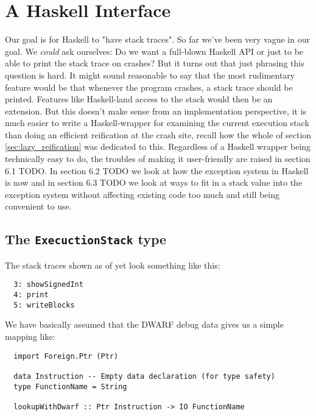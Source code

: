\chapter{A Haskell Interface}

Our goal is for Haskell to "have stack traces". So far we've been
very vague in our goal. We \emph{could} ask ourselves: Do we want a
full-blown Haskell API or just to be able to print the stack trace on
crashes? %
But it turns out that just phrasing this question is hard.
It might sound reasonable to say that the most rudimentary feature
would be that whenever the program crashes, a stack trace should be
printed. Features like Haskell-land access to the stack would then
be an extension. But this doesn't make sense from an implementation
perspective, it is much easier to write a Haskell-wrapper for examining
the current execution stack than doing an efficient reification at the
crash site, recall how the whole of section \ref{sec:lazy_reification}
was dedicated to this. Regardless of a Haskell wrapper being technically
easy to do,
the troubles of making it user-friendly are 
raised in section 6.1 TODO. In section
6.2 TODO we look at how the exception system in Haskell is now and
in section 6.3 TODO we look at ways to fit in a stack value into the
exception system without affecting existing code too much and still
being convenient to use.


\section{The \texttt{ExecuctionStack} type}

The stack traces shown as of yet look something like this:

\begin{verbatim}
  3: showSignedInt
  4: print
  5: writeBlocks
\end{verbatim}

We have basically assumed that the DWARF debug data gives us a simple
mapping like:

\begin{verbatim}
  import Foreign.Ptr (Ptr)

  data Instruction -- Empty data declaration (for type safety)
  type FunctionName = String

  lookupWithDwarf :: Ptr Instruction -> IO FunctionName
\end{verbatim}

